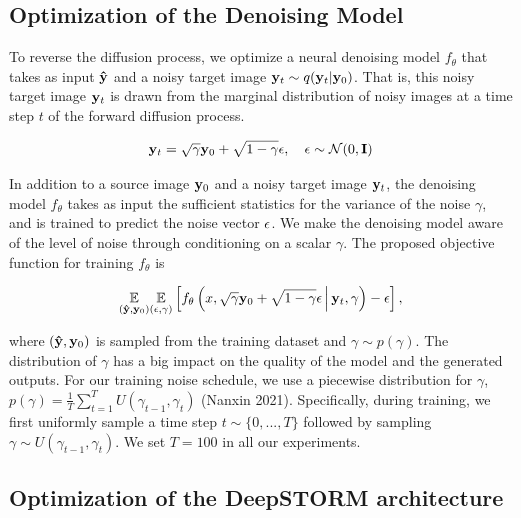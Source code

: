 \documentclass{article}
\begin{document}
\subsection{Optimization of the Denoising Model}

To reverse the diffusion process, we optimize a neural denoising model $f_{\theta}$ that takes as input $\bold{\hat{y}}$ and a noisy target image $\bold{y}_t \sim q(\bold{y}_t|\bold{y}_0)$. That is, this noisy target image $\bold{y}_t$ is drawn from the marginal distribution of noisy images at a time step $t$ of the forward diffusion process. 

\begin{equation}
\bold{y}_t = \sqrt{\gamma} \bold{y}_0 + \sqrt{1 - \gamma} \bold{\epsilon}, \quad \bold{\epsilon} \sim \mathcal{N}(0, \bold{I})
\end{equation}

In addition to a source image $\bold{y}_{0}$ and a noisy target image $\bold{y}_t$, the denoising model $f_{\theta}$ takes as input the sufficient statistics for the variance of the noise $\gamma$, and is trained to predict the noise vector $\bold{\epsilon}$. We make the denoising model aware of the level of noise through conditioning on a scalar $\gamma$. The proposed objective function for training $f_{\theta}$ is

\begin{equation}
\underset{(\bold{\hat{y}},\bold{y}_{0})}{\mathbb{E}}\underset{(\epsilon,\gamma)}{\mathbb{E}} \left[ f_{\theta}\left(x, \sqrt{\gamma} \bold{y}_0 + \sqrt{1 - \gamma} \epsilon \, \middle|\, \bold{y}_{t}, \gamma\right) - \epsilon \right],
\end{equation} 

where $(\bold{\hat{y}},\bold{y}_{0})$ is sampled from the training dataset and $\gamma \sim p(\gamma)$. The distribution of $\gamma$ has a big impact on the quality of the model and the generated outputs. For our training noise schedule, we use a piecewise distribution for $\gamma$, $p(\gamma) = \frac{1}{T}\sum_{t=1}^{T} U(\gamma_{t-1}, \gamma_t)$ (Nanxin 2021). Specifically, during training, we first uniformly sample a time step $t \sim \{0, ..., T\}$ followed by sampling $\gamma \sim U(\gamma_{t-1}, \gamma_t)$. We set $T = 100$ in all our experiments.

\subsection{Optimization of the DeepSTORM architecture}
\end{document}
